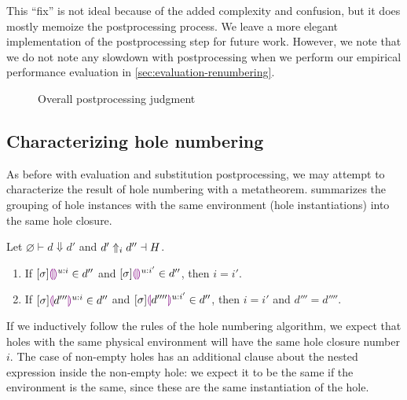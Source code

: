 This ``fix'' is not ideal because of the added complexity and confusion, but it does mostly memoize the postprocessing process. We leave a more elegant implementation of the postprocessing step for future work. However, we note that we do not note any slowdown with postprocessing when we perform our empirical performance evaluation in \cref{sec:evaluation-renumbering}.

\begin{figure}
  \centering
  \begin{mdframed}
    \begin{singlespace}
      
    \end{singlespace}
  \end{mdframed}
  \caption{Overall postprocessing judgment}
  \label{fig:big-step-postprocessing-rules}
\end{figure}

\subsection{Characterizing hole numbering}
\label{sec:hole-numbering-characterization}

As before with evaluation and substitution postprocessing, we may attempt to characterize the result of hole numbering with a metatheorem.  summarizes the grouping of hole instances with the same environment (hole instantiations) into the same hole closure.

\begin{theorem}
  Let $\varnothing\vdash d\Downarrow d'$ and $d'\Uparrow_{i} d''\dashv H$.
  \begin{enumerate}
  \item If $[\sigma]\textcolor{violet}{\llparenthesis}\textcolor{violet}{\rrparenthesis}^{u:i}\in d''$ and $[\sigma]\textcolor{violet}{\llparenthesis}\textcolor{violet}{\rrparenthesis}^{u:i'}\in d''$, then $i=i'$.
  \item If $[\sigma]\textcolor{violet}{\llparenthesis} d'''\textcolor{violet}{\rrparenthesis}^{u:i}\in d''$ and $[\sigma]\textcolor{violet}{\llparenthesis} d''''\textcolor{violet}{\rrparenthesis}^{u:i'}\in d''$, then $i=i'$ and $d'''=d''''$.
  \end{enumerate}
  \label{thm:hole-numbering-postprocessing}
\end{theorem}

If we inductively follow the rules of the hole numbering algorithm, we expect that holes with the same physical environment will have the same hole closure number $i$. The case of non-empty holes has an additional clause about the nested expression inside the non-empty hole: we expect it to be the same if the environment is the same, since these are the same instantiation of the hole.

